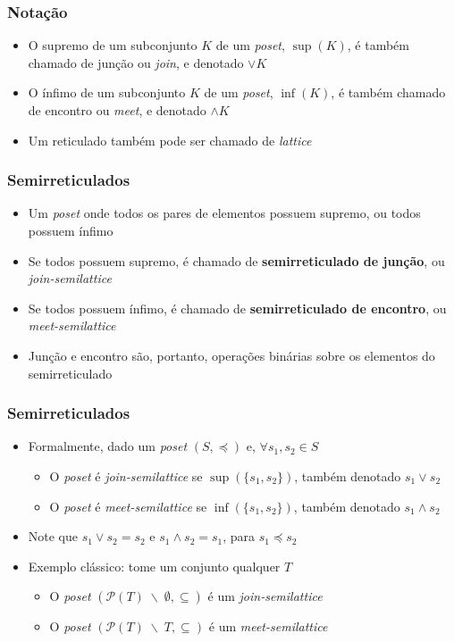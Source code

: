 \documentclass[12pt]{beamer}
\begin{document}
\begin{frame}
  \frametitle{Notação}
  \begin{itemize}
    \item O supremo de um subconjunto $K$ de um \emph{poset}, $\sup(K)$, é
        também chamado de junção ou \emph{join}, e denotado $\vee K$
    \item O ínfimo de um subconjunto $K$ de um \emph{poset}, $\inf(K)$, é
        também chamado de encontro ou \emph{meet}, e denotado $\wedge K$
    \item Um reticulado também pode ser chamado de \emph{lattice}
  \end{itemize}
\end{frame}

\begin{frame}
  \frametitle{Semirreticulados}
  \begin{itemize}
    \item<1-> Um \emph{poset} onde todos os pares de elementos possuem supremo,
        ou todos possuem ínfimo
    \item<2-> Se todos possuem supremo, é chamado de \textbf{semirreticulado de
        junção}, ou \emph{join-semilattice}
    \item<3-> Se todos possuem ínfimo, é chamado de \textbf{semirreticulado de
        encontro}, ou \emph{meet-semilattice}
    \item<4-> Junção e encontro são, portanto, operações binárias sobre os
        elementos do semirreticulado
  \end{itemize}
\end{frame}

\begin{frame}
  \frametitle{Semirreticulados}
  \begin{itemize}
    \item<1-> Formalmente, dado um \emph{poset} $(S, \preccurlyeq)$ e, $\forall
        s_1, s_2 \in S$
    \begin{itemize}[itemsep=0pt]
      \item O \emph{poset} é \emph{join-semilattice} se $\sup(\{s_1, s_2\})$,
          também denotado $s_1 \vee s_2$
      \item O \emph{poset} é \emph{meet-semilattice} se $\inf(\{s_1, s_2\})$,
          também denotado $s_1 \wedge s_2$
    \end{itemize}
    \item<2-> Note que $s_1 \vee s_2 = s_2$ e $s_1 \wedge s_2 = s_1$, para $s_1
        \preccurlyeq s_2$
    \item<3-> Exemplo clássico: tome um conjunto qualquer $T$
    \begin{itemize}[itemsep=0pt]
      \item O \emph{poset} $(\mathcal{P}(T) \; \backslash \; \emptyset,
          \subseteq)$ é um \emph{join-semilattice}
      \item O \emph{poset} $(\mathcal{P}(T) \; \backslash \; T, \subseteq)$ é
          um \emph{meet-semilattice}
    \end{itemize}
  \end{itemize}
\end{frame}
\end{document}
